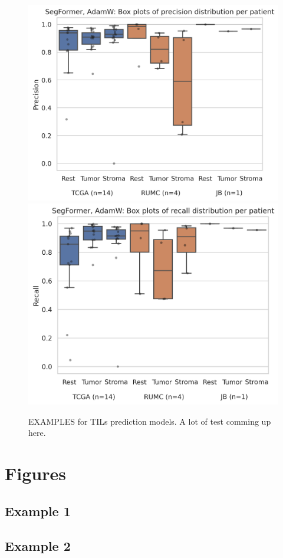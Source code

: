 \begin{figure}
\includegraphics[width=.5\linewidth]{figures/tissue/segformer,_adamw_prec_patient_wsirois.png}
\includegraphics[width=.5\linewidth]{figures/tissue/segformer,_adamw_recall_patient_wsirois.png}

\caption{EXAMPLES for TILs prediction models. A lot of test comming up here.}
\label{fig:figure3}
\end{figure}

\chapter{Figures}
\section{Example 1}
\cmark
\section{Example 2}
\xmark